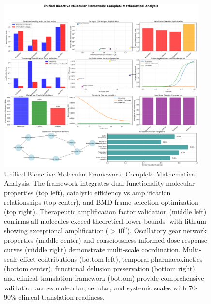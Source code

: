 \begin{figure}[htbp]
\centering
\includegraphics[width=0.95\textwidth]{images/unified_bioactive_framework_20251004_100644.png}
\caption{Unified Bioactive Molecular Framework: Complete Mathematical Analysis. The framework integrates dual-functionality molecular properties (top left), catalytic efficiency vs amplification relationships (top center), and BMD frame selection optimization (top right). Therapeutic amplification factor validation (middle left) confirms all molecules exceed theoretical lower bounds, with lithium showing exceptional amplification ($>10^{9}$). Oscillatory gear network properties (middle center) and consciousness-informed dose-response curves (middle right) demonstrate multi-scale coordination. Multi-scale effect contributions (bottom left), temporal pharmacokinetics (bottom center), functional delusion preservation (bottom right), and clinical translation framework (bottom) provide comprehensive validation across molecular, cellular, and systemic scales with 70-90\% clinical translation readiness.}
\label{fig:unified_framework}
\end{figure}

